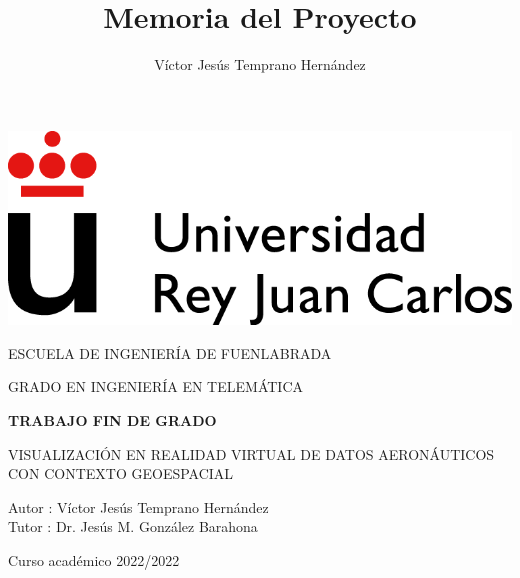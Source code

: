 \documentclass[a4paper, 11pt]{book}
\title{Memoria del Proyecto}
\author{Víctor Jesús Temprano Hernández}
\begin{document}
\renewcommand{\refname}{Bibliografía}  %
\renewcommand{\appendixname}{Apéndice}



\begin{titlepage}
\begin{center}
\includegraphics[scale=0.6]{img/URJ_logo_Color_POS.png}

\vspace{1.75cm}

\LARGE
ESCUELA DE INGENIERÍA DE FUENLABRADA
\vspace{1cm}

\LARGE
GRADO EN INGENIERÍA EN TELEMÁTICA

\vspace{1cm}
\LARGE
\textbf{TRABAJO FIN DE GRADO}

\vspace{2cm}

\Large
VISUALIZACIÓN EN REALIDAD VIRTUAL DE DATOS AERONÁUTICOS
CON CONTEXTO GEOESPACIAL

\vspace{2cm}

\large
Autor : Víctor Jesús Temprano Hernández \\
Tutor : Dr. Jesús M. González Barahona\\
\vspace{1cm}

\large
Curso académico 2022/2022

\end{center}
\end{titlepage}

\newpage
\mbox{}
\thispagestyle{empty} %



\clearpage
{}
\chapter*{}
\end{document}
